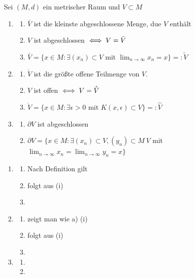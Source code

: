 \begin{prop}
	Sei $(M, d)$ ein metrischer Raum und $V \subset M$
	\begin{enumerate}[label=\alph*\upshape)]
		\item
			\begin{enumerate}
				\item $\bar V$ ist die kleinste abgeschlossene Menge, due $V$ enthält
				\item $V$ ist abgeschlossen $\iff V = \bar V$
				\item $\bar V = \{ x \in M: \exists (x_{n}) \subset V$ mit $\lim_{n \rightarrow \infty} x_{n} = x \} =: \tilde V$
			\end{enumerate} 
		\item 
			\begin{enumerate}
				\item $\mathring V$ ist die grö{\ss}te offene Teilmenge von $V$.
				\item $V$ ist offen $\iff V = \mathring V$
				\item $\mathring V = \{ x \in M: \exists \epsilon > 0$ mit $K(x, \epsilon) \subset V \} =: \hat V$
			\end{enumerate} 
		\item
			\begin{enumerate}
				\item $\partial V$ ist abgeschlossen
				\item $\partial V = \{ x \in M: \exists (x_{n}) \subset V, (y_{n}) \subset M \ V$ mit $ \lim_{n \rightarrow \infty} x_{n} = \lim_{n \rightarrow \infty} y_{n} = x \}$
			\end{enumerate} 
	\end{enumerate}	
	\begin{beweis}
		\begin{enumerate}[label=\alph*\upshape)]
			\item
				\begin{enumerate}
					\item Nach Definition gilt 
					\item folgt aus (i)
					\item %
				\end{enumerate} 
			\item 
				\begin{enumerate}
					\item zeigt man wie a) (i)
					\item folgt aus (i)
					\item %
				\end{enumerate} 
			\item
				\begin{enumerate}
					\item %
					\item %
				\end{enumerate} 
		\end{enumerate}	
	\end{beweis}
\end{prop}

